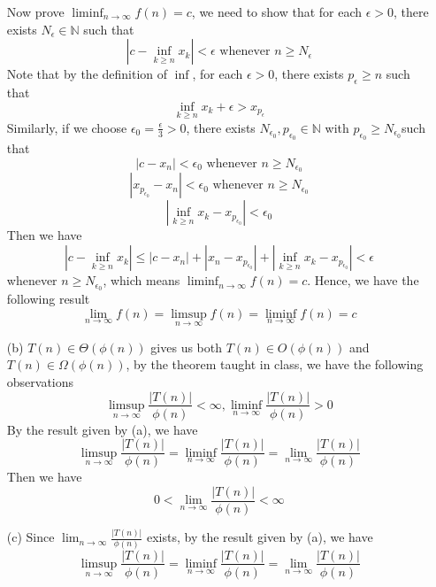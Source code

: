 \documentclass[12pt,a4paper]{article}
\begin{document}
\begin{enumerate}
        Now prove $\liminf_{n\to\infty}f(n) = c$, we need to show that for each $\epsilon > 0$, there exists $N_{\epsilon} \in \mathbb{N}$ such that
        \[
            \left\lvert c - \inf_{k\geq n}x_k \right\rvert  < \epsilon \text{ whenever } n \geq N_{\epsilon}
        \]
        Note that by the definition of $\inf$, for each $\epsilon > 0$, there exists $p_\epsilon \geq n$ such that
        \[
            \inf_{k \geq n}x_k + \epsilon > x_{p_\epsilon}
        \]
        Similarly, if we choose $\epsilon_0 = \frac{\epsilon}{3} > 0$, there exists $N_{\epsilon_0}, p_{\epsilon_0} \in \mathbb{N}$ with $p_{\epsilon_0} \geq N_{\epsilon_0}$such that
        \[
            \left\lvert c - x_n \right\rvert < \epsilon_0 \text{ whenever } n \geq N_{\epsilon_0}
        \]
        \[
            \left\lvert x_{p_{\epsilon_0}} - x_n \right\rvert < \epsilon_0 \text{ whenever } n \geq N_{\epsilon_0}
        \]
        \[
            \left\lvert \inf_{k \geq n}x_k - x_{p_{\epsilon_0}}\right\rvert  < \epsilon_0
        \]
        Then we have
        \[
            \left\lvert c - \inf_{k\geq n}x_k \right\rvert \leq \left\lvert c - x_n \right\rvert + \left\lvert x_n - x_{p_{\epsilon_0}} \right\rvert + \left\lvert \inf_{k \geq n}x_k - x_{p_{\epsilon_0}}\right\rvert < \epsilon
        \]
        whenever $n \geq N_{\epsilon_0}$, which means $\liminf_{n\to\infty}f(n) = c$.
        Hence, we have the following result
        \[
            \lim_{n\to\infty} f(n) = \limsup_{n\to\infty} f(n) = \liminf_{n\to\infty} f(n) = c
        \]
    \item[(b)]
        $T(n) \in \Theta (\phi(n)) $ gives us both $T(n) \in O(\phi(n))$ and $T(n) \in \Omega(\phi(n))$, by the theorem taught in class, we have the following observations
        \[
            \limsup_{n\to\infty} \frac{\left\lvert T(n)\right\rvert }{\phi(n)} < \infty, \liminf_{n\to\infty} \frac{\left\lvert T(n)\right\rvert }{\phi(n)} > 0
        \]
        By the result given by (a), we have 
        \[
            \limsup_{n\to\infty} \frac{\left\lvert T(n)\right\rvert }{\phi(n)} = \liminf_{n\to\infty} \frac{\left\lvert T(n)\right\rvert }{\phi(n)} = \lim_{n\to\infty} \frac{\left\lvert T(n)\right\rvert }{\phi(n)}
        \]
        Then we have
        \[
            0 < \lim_{n\to\infty} \frac{\left\lvert T(n)\right\rvert }{\phi(n)} < \infty
        \]
    \item[(c)]
        Since $\lim_{n\to\infty} \frac{\left\lvert T(n)\right\rvert }{\phi(n)}$ exists, by the result given by (a), we have 
        \[
            \limsup_{n\to\infty} \frac{\left\lvert T(n)\right\rvert }{\phi(n)} = \liminf_{n\to\infty} \frac{\left\lvert T(n)\right\rvert }{\phi(n)} = \lim_{n\to\infty} \frac{\left\lvert T(n)\right\rvert }{\phi(n)}
\]
\end{enumerate}
\end{document}
